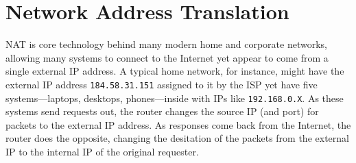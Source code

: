 \begin{comment}

\subsection{\ac{IPv4} Packet Structure}
\label{sec:ipv4}
\par 

\begin{table}
\caption{IPv4 header structure}
\label{tab:ipv4}
\begin{tabular}{|c|c|c|c|c|c|c|c||c|c|c|c|c|c|c|c||c|c|c|c|c|c|c|c||c|c|c|c|c|c|c|c|}
\hline
	\multicolumn{32}{|c|}{\textbf{IPv4 Structure (32 bits wide)}}\\
\hline
	0 & 1 & 2 & 3 & 4 & 5 & 6 & 7 & 8 & 9 & 10 & 11 & 12 & 13 & 14 & 15 & 16 & 17 & 18 & 19 & 20 & 21 & 22 & 23 & 24 & 25 & 26 & 27 & 28 & 29 & 30 & 31\\
\hline
\hline
	\multicolumn{4}{|c|}{Version} & \multicolumn{4}{|c|}{Header Len} & \multicolumn{8}{|c|}{TOS} & \multicolumn{16}{|c|}{Len}\\
	\hline
	\multicolumn{16}{|c|}{ID} & \multicolumn{3}{|c|}{Frag Flags} & \multicolumn{13}{|c|}{Fragment Offset}\\
	\hline
	\multicolumn{8}{|c|}{TTL} & \multicolumn{8}{|c|}{Protocol} & \multicolumn{16}{|c|}{Header Checksum}\\
	\hline
	\multicolumn{32}{|c|}{Source IP}\\
	\hline
	\multicolumn{32}{|c|}{Destination IP}\\
	\hline
	\multicolumn{32}{|c|}{Options (optional, specified by header len)}\\
\hline
\end{tabular}
\end{table}
\end{comment}

\section{Network Address Translation}
\label{sec:nat}
\par \ac{NAT} is core technology behind many modern home and corporate networks, allowing many systems to connect to the Internet yet appear to come from a single external \ac{IP} address. A typical home network, for instance, might have the external IP address \texttt{184.58.31.151} assigned to it by the \ac{ISP} yet have five systems---laptops, desktops, phones---inside with IPs like \texttt{192.168.0.X}. As these systems send requests out, the router changes the source IP (and port) for packets to the external IP address. As responses come back from the Internet, the router does the opposite, changing the desitation of the packets from the external IP to the internal IP of the original requester.

